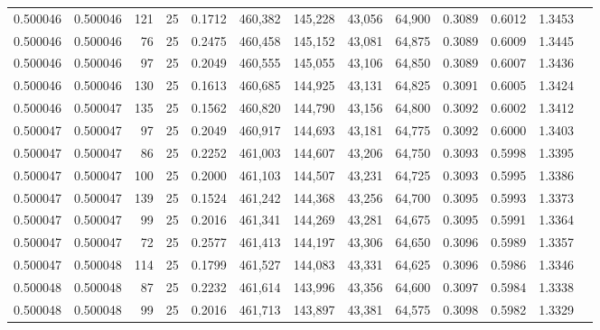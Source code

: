 \begin{tabular}{rrrrrrrrrrrrr}
0.500046 & 0.500046 &   121 &  25 &                                     0.1712 & 460,382 & 145,228 &  43,056 &  64,900 & 0.3089 & 0.6012 & 1.3453 \\
0.500046 & 0.500046 &    76 &  25 &                                     0.2475 & 460,458 & 145,152 &  43,081 &  64,875 & 0.3089 & 0.6009 & 1.3445 \\
0.500046 & 0.500046 &    97 &  25 &                                     0.2049 & 460,555 & 145,055 &  43,106 &  64,850 & 0.3089 & 0.6007 & 1.3436 \\
0.500046 & 0.500046 &   130 &  25 &                                     0.1613 & 460,685 & 144,925 &  43,131 &  64,825 & 0.3091 & 0.6005 & 1.3424 \\
0.500046 & 0.500047 &   135 &  25 &                                     0.1562 & 460,820 & 144,790 &  43,156 &  64,800 & 0.3092 & 0.6002 & 1.3412 \\
0.500047 & 0.500047 &    97 &  25 &                                     0.2049 & 460,917 & 144,693 &  43,181 &  64,775 & 0.3092 & 0.6000 & 1.3403 \\
0.500047 & 0.500047 &    86 &  25 &                                     0.2252 & 461,003 & 144,607 &  43,206 &  64,750 & 0.3093 & 0.5998 & 1.3395 \\
0.500047 & 0.500047 &   100 &  25 &                                     0.2000 & 461,103 & 144,507 &  43,231 &  64,725 & 0.3093 & 0.5995 & 1.3386 \\
0.500047 & 0.500047 &   139 &  25 &                                     0.1524 & 461,242 & 144,368 &  43,256 &  64,700 & 0.3095 & 0.5993 & 1.3373 \\
0.500047 & 0.500047 &    99 &  25 &                                     0.2016 & 461,341 & 144,269 &  43,281 &  64,675 & 0.3095 & 0.5991 & 1.3364 \\
0.500047 & 0.500047 &    72 &  25 &                                     0.2577 & 461,413 & 144,197 &  43,306 &  64,650 & 0.3096 & 0.5989 & 1.3357 \\
0.500047 & 0.500048 &   114 &  25 &                                     0.1799 & 461,527 & 144,083 &  43,331 &  64,625 & 0.3096 & 0.5986 & 1.3346 \\
0.500048 & 0.500048 &    87 &  25 &                                     0.2232 & 461,614 & 143,996 &  43,356 &  64,600 & 0.3097 & 0.5984 & 1.3338 \\
0.500048 & 0.500048 &    99 &  25 &                                     0.2016 & 461,713 & 143,897 &  43,381 &  64,575 & 0.3098 & 0.5982 & 1.3329 \\

\end{tabular}
